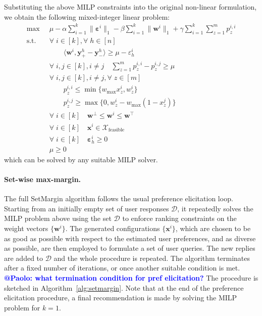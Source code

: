 \documentclass{article}
\renewcommand\[{\begin{equation}}
\renewcommand\]{\end{equation}}
\newcommand{\calvar}[1]{\ensuremath{\mathcal{#1}}}
\newcommand{\calD}{\calvar{D}}
\newcommand{\calX}{\calvar{X}}
\newcommand{\vecvar}[1]{\ensuremath{\boldsymbol{#1}}}
\newcommand{\vw}{\vecvar{w}}
\newcommand{\vx}{\vecvar{x}}
\newcommand{\vy}{\vecvar{y}}
\newcommand{\veps}{\vecvar{\varepsilon}}
\newcommand{\andrea}[1]{{\bf \textcolor{blue}{{\fbox{Andrea:} #1}}}}
\begin{document}
Substituting the above MILP constraints into the original non-linear
formulation, we obtain the following mixed-integer linear problem:
%
{\footnotesize
\begin{align}
    \max
        & \;\; \mu - \alpha \sum_{i=1}^k \| \veps^{i} \|_1 - \beta \sum_{i=1}^k \| \vw^{i} \|_1 + \gamma \sum_{i=1}^k \sum_{z=1}^m p^{i,i}_z
        \nonumber
    \\
    \text{s.t.}
        & \;\; \forall \; i \in [k], \forall \; h \in [n] \nonumber
    \\
        & \;\; \qquad \langle \vw^{i}, \vy^{h}_+ - \vy^{h}_- \rangle \ge \mu - \varepsilon^{i}_h \nonumber
    \\
        & \;\; \forall \; i, j \in [k], i \neq j \quad \sum_{z=1}^m p^{i,i}_z - p^{i,j}_z \ge \mu
    \\
        & \;\; \forall \; i, j \in [k], i \neq j, \forall \; z \in [m] \nonumber
    \\
        & \;\; \qquad p^{i,i}_z \le \min \{ w_\text{max} x^{i}_z, w^{i}_z \}
    \\
        & \;\; \qquad p^{i,j}_z \ge \max \{ 0, w^{i}_z - w_\text{max}(1 - x^{j}_z) \}
    \\
        & \;\; \forall \; i \in [k] \quad \vw^\bot \le \vw^{i} \le \vw^\top \label{eq:wbounds2}
    \\
        & \;\; \forall \; i \in [k] \quad \vx^{i} \in \calX_{\text{feasible}} \nonumber
    \\
        & \;\; \forall \; i \in [k] \quad \veps^{i}_h \ge 0 \nonumber
    \\
        & \;\; \mu \ge 0 \nonumber
\end{align}
}
%
which can be solved by any suitable MILP solver.

\paragraph{Set-wise max-margin.} The full {\sc SetMargin} algorithm
follows the usual preference elicitation loop. Starting from an
initially empty set of user responses $\calD$, it repeatedly solves
the MILP problem above using the set $\calD$ to enforce ranking
constraints on the weight vectors $\{\vw^i\}$. The generated
configurations $\{\vx^i\}$, which are chosen to be as good as possible
with respect to the estimated user preferences, and as diverse as
possible, are then employed to formulate a set of user queries. The
new replies are added to $\calD$ and the whole procedure is
repeated. The algorithm terminates after a fixed number of iterations,
or once another suitable condition is met. \andrea{@Paolo: what termination
condition for pref elicitation?}  The procedure is sketched in
Algorithm~\ref{alg:setmargin}. Note that at the end of the preference
elicitation procedure, a final recommendation is made by solving the
MILP problem for $k=1$.
\end{document}
